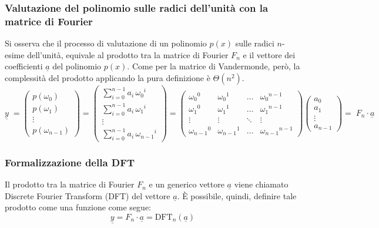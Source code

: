 \subsubsection*{Valutazione del polinomio sulle radici dell'unità con la matrice di Fourier}
Si osserva che il processo di valutazione di un polinomio \(p(x)\) sulle radici \(n\)-esime dell'unità, equivale al prodotto
tra la matrice di Fourier \(F_n\) e il vettore dei coefficienti \(\underline{a}\) del polinomio \(p(x)\). Come per la matrice
di Vandermonde, però, la complessità del prodotto applicando la pura definizione è \(\Theta(n^2)\).
\[\underline{y} \; = \begin{pmatrix}
	p(\omega_0) \\[3pt] p(\omega_1) \\[3pt] \vdots \\[3pt] p(\omega_{n-1})
\end{pmatrix} = \begin{pmatrix}
	\sum_{i=0}^{n-1} a_i \, {\omega_0}^i \\[3pt]
	\sum_{i=0}^{n-1} a_i \, {\omega_1}^i \\[3pt]
	\vdots \\[3pt]
	\sum_{i=0}^{n-1} a_i \, {\omega_{n-1}}^i
\end{pmatrix} =
\begin{pmatrix}
	{\omega_0}^0 & {\omega_0}^1 & \dots & {\omega_0}^{n-1} \\
	{\omega_1}^0 & {\omega_1}^1 & \dots & {\omega_1}^{n-1} \\
	\vdots & \vdots & \ddots & \vdots \\
	{\omega_{n-1}}^0 & {\omega_{n-1}}^1 & \dots & {\omega_{n-1}}^{n-1}
\end{pmatrix} \begin{pmatrix}
	a_0 \\ a_1 \\ \vdots \\ a_{n-1}
\end{pmatrix} = \; F_n \cdot \underline{a}\]

\subsubsection*{Formalizzazione della DFT}
Il prodotto tra la matrice di Fourier \(F_n\) e un generico vettore \(\underline{a}\) viene chiamato Discrete Fourier
Transform (DFT) del vettore \(\underline{a}\). È possibile, quindi, definire tale prodotto come una funzione come segue:
\[\underline{y} = F_n \cdot \underline{a} = \text{DFT}_n \left( \underline{a} \right)\]


